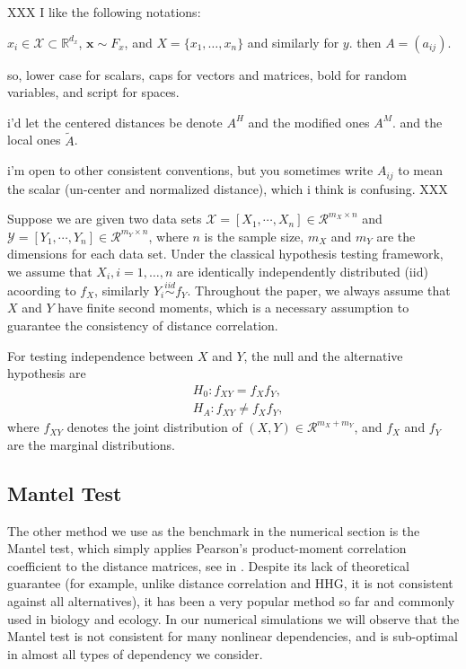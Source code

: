 \documentclass[11pt]{article}
\providecommand{\mt}[1]{\widetilde{#1}}
\providecommand{\mb}[1]{\boldsymbol{#1}}
\providecommand{\mc}[1]{\mathcal{#1}}
\newcommand{\Real}{\mathbb{R}}
\begin{document}
XXX I like the following notations:

$x_i \in \mc{X} \subset \Real^{d_x}$, $\mb{x} \sim F_x$, and $X=\{x_1,\ldots,x_n\}$ and similarly for $y$. then $A=(a_{ij})$. 

so, lower case for scalars, caps for vectors and matrices, bold for random variables, and script for spaces.  

i'd let the centered distances be denote $A^H$ and the modified ones $A^M$.
and the local ones $\mt{A}$.

i'm open to other consistent conventions, but you sometimes write $A_{ij}$ to mean the scalar (un-center and normalized distance), which i think is confusing.
XXX


Suppose we are given two data sets $\mathcal{X}=[X_{1},\cdots, X_{n}] \in \mathcal{R}^{m_{X} \times n}$ and $\mathcal{Y}=[Y_{1},\cdots, Y_{n}] \in \mathcal{R}^{m_{Y} \times n}$, where $n$ is the sample size, $m_{X}$ and $m_{Y}$ are the dimensions for each data set. Under the classical hypothesis testing framework, we assume that $X_{i}, i=1,\ldots,n$ are identically independently distributed (iid) acoording to $f_X$, similarly $Y_{i} \stackrel{iid}{\sim} f_Y$. Throughout the paper, we always assume that $X$ and $Y$ have finite second moments, which is a necessary assumption to guarantee the consistency of distance correlation.

For testing independence between $X$ and $Y$, the null and the alternative hypothesis are
\begin{align*}
& H_{0}: f_{XY}=f_{X}f_{Y},\\
& H_{A}: f_{XY} \neq f_{X}f_{Y},
\end{align*}
where $f_{XY}$ denotes the joint distribution of $(X,Y) \in \mathcal{R}^{m_{X}+m_{Y}}$, and $f_{X}$ and $f_{Y}$ are the marginal distributions. 


\subsection{Mantel Test}
\label{sec:hhg}



The other method we use as the benchmark in the numerical section is the Mantel test, which simply applies Pearson's product-moment correlation coefficient  to the distance matrices, see in \cite{Mantel1967}. Despite its lack of theoretical guarantee (for example, unlike distance correlation and HHG, it is not consistent against all alternatives), it has been a very popular method so far and commonly used in biology and ecology. In our numerical simulations we will observe that the Mantel test is not consistent for many nonlinear dependencies, and is sub-optimal in almost all types of dependency we consider.
\end{document}
